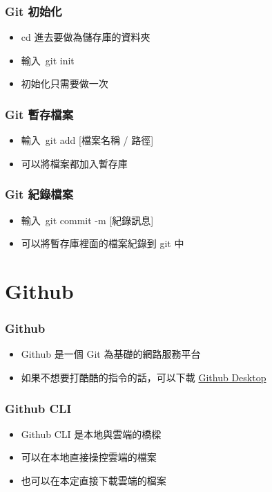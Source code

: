 \documentclass[mathserif]{beamer}
\begin{document}
\begin{frame}
    \frametitle{Git 初始化}
    \begin{itemize}
        \item {\color{red}cd} 進去要做為儲存庫的資料夾
        \item 輸入\ {\color{red}git init}
        \item 初始化只需要做一次
    \end{itemize}
\end{frame}

\begin{frame}
    \frametitle{Git 暫存檔案}
    \begin{itemize}
        \item 輸入\ {\color{red}git add [檔案名稱 / 路徑]}
        \item 可以將檔案都加入暫存庫
    \end{itemize}
\end{frame}

\begin{frame}
    \frametitle{Git 紀錄檔案}
    \begin{itemize}
        \item 輸入\ {\color{red}git commit -m [紀錄訊息]}
        \item 可以將暫存庫裡面的檔案紀錄到 git 中
    \end{itemize}
\end{frame}

\section{Github}

\begin{frame}
    \frametitle{Github}
    \begin{itemize}
        \item Github 是一個 Git 為基礎的網路服務平台
        \item<2-> 如果不想要打酷酷的指令的話，可以下載 \href{https://desktop.github.com/}{Github Desktop}
    \end{itemize}
\end{frame}

\begin{frame}
    \frametitle{Github CLI}
    \begin{itemize}
        \item Github CLI 是本地與雲端的橋樑
        \item 可以在本地直接操控雲端的檔案
        \item 也可以在本定直接下載雲端的檔案
    \end{itemize}
\end{frame}
\end{document}
